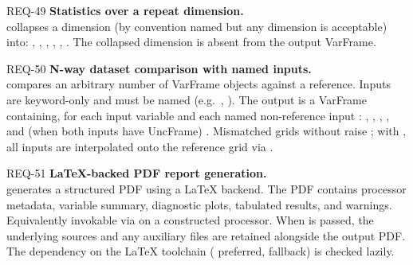 \begin{reqbox}{REQ-49}{\stable}
\textbf{Statistics over a repeat dimension.}\\
 collapses a dimension (by convention named  but any dimension is acceptable) into:
, , , ,
, . The collapsed dimension is absent from
the output VarFrame.
\end{reqbox}

\begin{reqbox}{REQ-50}{\stable}
\textbf{N-way dataset comparison with named inputs.}\\
 compares an
arbitrary number of VarFrame objects against a reference. Inputs are
keyword-only and must be named (e.g.\ ,
). The output is a VarFrame containing, for each
input variable and each named non-reference input :
, , ,
, and (when both inputs have UncFrame)
. Mismatched grids without 
raise ; with , all inputs are
interpolated onto the reference grid via .
\end{reqbox}

\begin{reqbox}{REQ-51}{\stable}
\textbf{LaTeX-backed PDF report generation.}\\
 generates a structured PDF using a
LaTeX backend. The PDF contains processor metadata, variable summary,
diagnostic plots, tabulated results, and warnings. Equivalently invokable
via  on a constructed processor. When
 is passed,
the underlying  sources and any auxiliary files are retained
alongside the output PDF. The dependency on the LaTeX toolchain
( preferred,  fallback) is checked lazily.
\end{reqbox}

